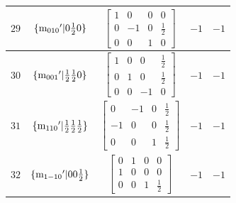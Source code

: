 \documentclass[fleqn,8pt]{jsarticle}
\begin{document}
\begin{longtable}{ccccc}
$ 29 $ & $ \{{\rm m}_{010}{}'|0 \frac{1}{2} 0\} $ & $ \begin{bmatrix} 1 & 0 & 0 & 0 \\ 0 & -1 & 0 & \frac{1}{2} \\ 0 & 0 & 1 & 0 \end{bmatrix} $ & $ -1 $ & $ -1 $ \\ \hline
$ 30 $ & $ \{{\rm m}_{001}{}'|\frac{1}{2} \frac{1}{2} 0\} $ & $ \begin{bmatrix} 1 & 0 & 0 & \frac{1}{2} \\ 0 & 1 & 0 & \frac{1}{2} \\ 0 & 0 & -1 & 0 \end{bmatrix} $ & $ -1 $ & $ -1 $ \\ \hline
$ 31 $ & $ \{{\rm m}_{110}{}'|\frac{1}{2} \frac{1}{2} \frac{1}{2}\} $ & $ \begin{bmatrix} 0 & -1 & 0 & \frac{1}{2} \\ -1 & 0 & 0 & \frac{1}{2} \\ 0 & 0 & 1 & \frac{1}{2} \end{bmatrix} $ & $ -1 $ & $ -1 $ \\ \hline
$ 32 $ & $ \{{\rm m}_{1-10}{}'|0 0 \frac{1}{2}\} $ & $ \begin{bmatrix} 0 & 1 & 0 & 0 \\ 1 & 0 & 0 & 0 \\ 0 & 0 & 1 & \frac{1}{2} \end{bmatrix} $ & $ -1 $ & $ -1 $ \\
\end{longtable}
\end{document}
